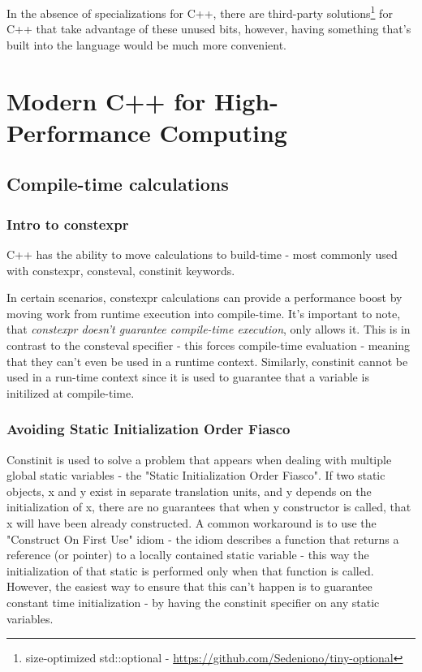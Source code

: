 \documentclass[
    english, %
]{VUMIFPSkursinis}
\begin{document}
In the absence of specializations for C++, there are third-party solutions\footnote{size-optimized std::optional - \url{https://github.com/Sedeniono/tiny-optional}} for C++ that take advantage of these unused bits, however, having something that's built into the language would be much more convenient.

\FloatBarrier
\section{Modern C++ for High-Performance Computing}

\FloatBarrier
\subsection{Compile-time calculations}

\FloatBarrier
\subsubsection{Intro to constexpr}
C++ has the ability to move calculations to build-time - most commonly used with constexpr, consteval, constinit keywords.

In certain scenarios, constexpr calculations can provide a performance boost by moving work from runtime execution into
compile-time. It's important to note, that \textit{constexpr doesn't guarantee compile-time execution}, only allows it. This is
in contrast to the consteval specifier - this forces compile-time evaluation - meaning that they can't
even be used in a runtime context. Similarly, constinit cannot be used in a run-time context since it
is used to guarantee that a variable is initilized at compile-time.

\FloatBarrier
\subsubsection{Avoiding Static Initialization Order Fiasco}

Constinit is used to solve a problem that appears when dealing with multiple global static variables - the "Static Initialization Order Fiasco". If two static objects, x and y exist in separate translation units, and y
depends on the initialization of x, there are no guarantees that when y constructor is called, that x will have
been already constructed. A common workaround is to use the "Construct On First Use" idiom - the idiom describes a function that returns a reference (or pointer) to a locally contained static variable - this way the initialization of that static is performed only when that function is called. However, the easiest way to ensure that this can't happen is to guarantee constant time initialization - by having the constinit specifier on any static variables.
\end{document}

